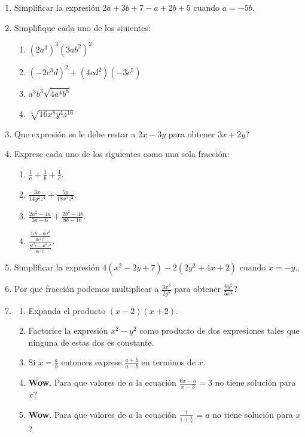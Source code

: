 \begin{enumerate}
	\item Simplificar la expresión $2a+3b+7-a+2b+5$ cuando $a=-5b$.
	
	\item Simplifique cada uno de los siuientes:
	\begin{multicols}{2}
		\begin{enumerate}[label=(\Alph*)]
			\item ${(2a^3)}^3 {(3ab^2)}^2$
			\item ${(-2c^3d)}^2 + (4cd^2)(-3c^5)$
			\item $a^3b^3 \sqrt{4a^4b^8}$
			\item $\sqrt[4]{16x^8y^4z^{16}}$
		\end{enumerate}
	\end{multicols}
	
	\item Que expresión se le debe restar a $2x-3y$ para obtener $3x+2y$?
	
	\item Exprese cada uno de los siguientes como una sola fracción:
	\begin{multicols}{2}
		\begin{enumerate}[label=(\Alph*)]
			\item $\frac{1}{a} + \frac{1}{b} + \frac{1}{c}$.
			\item $\frac{3x}{14y^2z^4} + \frac{5y}{18x^3z^2}$.
			\item $\frac{2a^2 - 4a}{3a-6} + \frac{2b^2 - 4b}{8b - 16}$.
			\item $\frac{\frac{3r^2t-6rt^2}{6r^2t^3}}{\frac{8t^3r-4t^2r^2}{6r^3t^4}}$.
		\end{enumerate}
	\end{multicols}
	
	\item Simplificar la expresión $4(x^2 -2y +7) -2(2y^2+4x+2)$ cuando $x=-y$..
	
	\item Por que fracción podemos multiplicar a $\frac{3x^3}{2y^5}$ para obtener $\frac{6y^2}{5x^2}$?
	
	\item
	\begin{enumerate}[label=(\Alph*)]
		\item Expanda el producto $(x-2)(x+2)$.
		\item Factorice la expresión $x^2-y^2$ como producto de dos expresiones tales que ninguna de estas dos es constante.
		
		\item Si $x=\frac{a}{b}$ entonces exprese $\frac{a+b}{a-b}$ en terminos de $x$.
		
		\item \textbf{Wow}. Para que valores de $a$ la ecuación $\frac{6x-a}{x-3} = 3$ no tiene solución para $x$?
		
		\item \textbf{Wow}. Para que valores de $a$ la ecuación $\frac{1}{1+\frac{1}{x}} = a$ no tiene solución para $x$?
		
	\end{enumerate}
\end{enumerate}
\newpage

